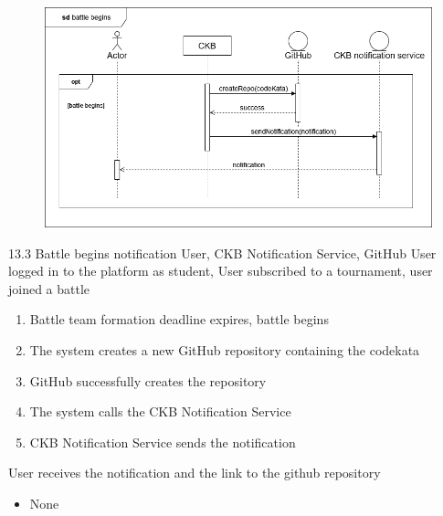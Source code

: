 \usecase
{
    \begin{figure}[H]
        \centering
        \includegraphics[width=\textwidth]{src/sequence_diagrams/battlebegins.png}
    \end{figure}
}
{13.3}
{Battle begins notification} %
{User, CKB Notification Service, GitHub} %
{User logged in to the platform as student, User subscribed to a tournament, user joined a battle} %
{ %
    \begin{enumerate}
        \item Battle team formation deadline expires, battle begins
        \item The system creates a new GitHub repository containing the codekata
        \item GitHub successfully creates the repository 
        \item The system calls the CKB Notification Service 
        \item CKB Notification Service sends the notification
    \end{enumerate}
}
{User receives the notification and the link to the github repository} %
{ %
    \begin{itemize}
        \item None
    \end{itemize}
}
{ %

}

